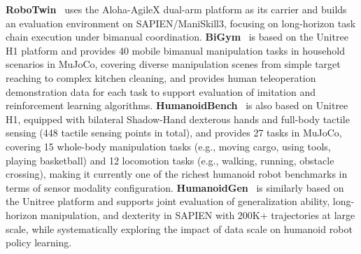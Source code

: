\textbf{RoboTwin}~\cite{RoboTwin} uses the Aloha-AgileX dual-arm platform as its
carrier and builds an evaluation environment on SAPIEN/ManiSkill3, focusing on long-horizon
task chain execution under bimanual coordination.
\textbf{BiGym}~\cite{chernyadev2024bigym} is based on the Unitree H1 platform and provides
40 mobile bimanual manipulation tasks in household scenarios in MuJoCo, covering diverse
manipulation scenes from simple target reaching to complex kitchen cleaning, and provides
human teleoperation demonstration data for each task to support evaluation of imitation and
reinforcement learning algorithms. \textbf{HumanoidBench}~\cite{sferrazza2024humanoidbench}
is also based on Unitree H1, equipped with bilateral Shadow-Hand dexterous hands and
full-body tactile sensing (448 tactile sensing points in total), and provides 27 tasks in
MuJoCo, covering 15 whole-body manipulation tasks (e.g., moving cargo, using tools, playing
basketball) and 12 locomotion tasks (e.g., walking, running, obstacle crossing), making it
currently one of the richest humanoid robot benchmarks in terms of sensor modality
configuration. \textbf{HumanoidGen}~\cite{li2025humanoidgen} is similarly based on the
Unitree platform and supports joint evaluation of generalization ability, long-horizon
manipulation, and dexterity in SAPIEN with 200K+ trajectories at large scale, while
systematically exploring the impact of data scale on humanoid robot policy learning.





